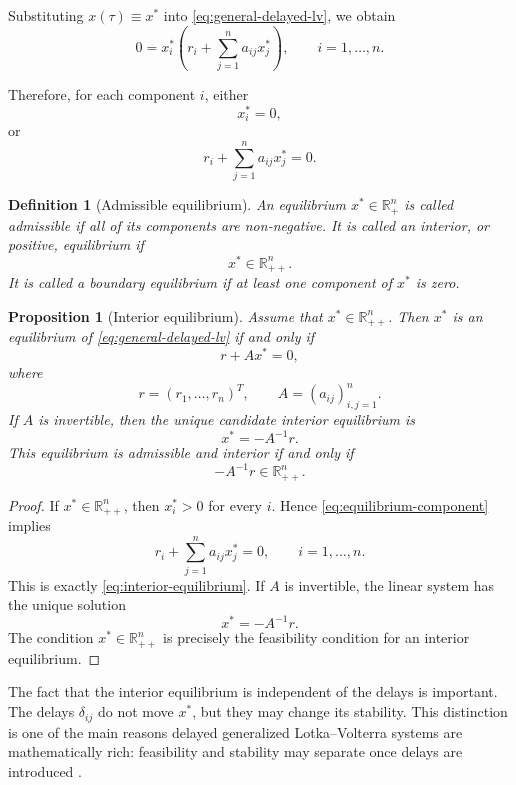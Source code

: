 \documentclass[11pt]{article}
\newtheorem{definition}{Definition}
\newtheorem{proposition}{Proposition}
\begin{document}
Substituting \(x(\tau)\equiv x^\ast\) into \eqref{eq:general-delayed-lv}, we
obtain
\begin{equation}
\label{eq:equilibrium-component}
0
=
x_i^\ast
\left(
r_i+\sum_{j=1}^{n}a_{ij}x_j^\ast
\right),
\qquad i=1,\ldots,n.
\end{equation}

Therefore, for each component \(i\), either
\[
x_i^\ast=0,
\]
or
\[
r_i+\sum_{j=1}^{n}a_{ij}x_j^\ast=0.
\]

\begin{definition}[Admissible equilibrium]
	An equilibrium \(x^\ast\in\mathbb{R}^{n}_{+}\) is called admissible if all of its
	components are non-negative. It is called an interior, or positive, equilibrium
	if
	\[
	x^\ast\in\mathbb{R}^{n}_{++}.
	\]
	It is called a boundary equilibrium if at least one component of \(x^\ast\) is
	zero.
\end{definition}

\begin{proposition}[Interior equilibrium]
	\label{prop:interior-equilibrium}
	Assume that \(x^\ast\in\mathbb{R}^{n}_{++}\). Then \(x^\ast\) is an equilibrium
	of \eqref{eq:general-delayed-lv} if and only if
	\begin{equation}
	\label{eq:interior-equilibrium}
	r+Ax^\ast=0,
	\end{equation}
	where
	\[
	r=(r_1,\ldots,r_n)^{T},
	\qquad
	A=(a_{ij})_{i,j=1}^{n}.
	\]
	If \(A\) is invertible, then the unique candidate interior equilibrium is
	\begin{equation}
	\label{eq:positive-eq-formula}
	x^\ast=-A^{-1}r.
	\end{equation}
	This equilibrium is admissible and interior if and only if
	\[
	-A^{-1}r\in\mathbb{R}^{n}_{++}.
	\]
\end{proposition}

\begin{proof}
	If \(x^\ast\in\mathbb{R}^{n}_{++}\), then \(x_i^\ast>0\) for every \(i\). Hence
	\eqref{eq:equilibrium-component} implies
	\[
	r_i+\sum_{j=1}^{n}a_{ij}x_j^\ast=0,
	\qquad i=1,\ldots,n.
	\]
	This is exactly \eqref{eq:interior-equilibrium}. If \(A\) is invertible, the
	linear system has the unique solution
	\[
	x^\ast=-A^{-1}r.
	\]
	The condition \(x^\ast\in\mathbb{R}^{n}_{++}\) is precisely the feasibility
	condition for an interior equilibrium.
\end{proof}

 
	The fact that the interior equilibrium is independent of the delays is important.
	The delays \(\delta_{ij}\) do not move \(x^\ast\), but they may change its
	stability. This distinction is one of the main reasons delayed generalized
	Lotka--Volterra systems are mathematically rich: feasibility and stability may
	separate once delays are introduced \cite{saeedian2022delay,pigani2022delay}.
 
\end{document}

